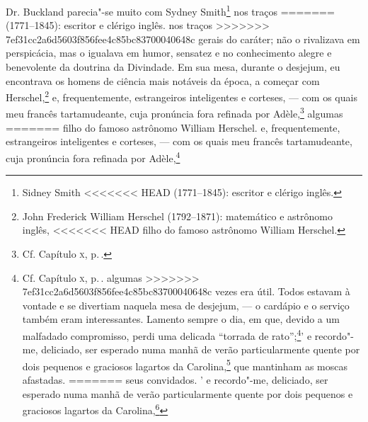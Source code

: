 {{{{{{{{{{{{{{{{{{{{{{{{{{{{{{{{{{{{{{{{{{{{{{{{{{{{{{{{{{{{{{{{{{{{{{{{{{{{{{{{{{{{{{{{{{{{{{{{{{{{{{{Dr. Buckland parecia"-se muito com Sydney Smith\footnote{Sidney Smith
<<<<<<< HEAD
  (1771--1845): escritor e clérigo inglês.} nos traços
=======
  (1771--1845): escritor e clérigo inglês.  nos traços
>>>>>>> 7ef31cc2a6d5603f856fee4c85bc83700040648c
gerais do caráter; não o rivalizava em perspicácia, mas o igualava em
humor, sensatez e no conhecimento alegre e benevolente da doutrina da
Divindade. Em sua mesa, durante o desjejum, eu encontrava os homens de
ciência mais notáveis da época, a começar com Herschel,\footnote{John
  Frederick William Herschel (1792--1871): matemático e astrônomo inglês,
<<<<<<< HEAD
  filho do famoso astrônomo William Herschel.} e,
frequentemente, estrangeiros inteligentes e corteses, --- com os quais
meu francês tartamudeante, cuja pronúncia fora refinada por
Adèle,\footnote{Cf. Capítulo \textsc{x}, p.\,\pageref{207}.} algumas
=======
  filho do famoso astrônomo William Herschel.  e,
frequentemente, estrangeiros inteligentes e corteses, --- com os quais
meu francês tartamudeante, cuja pronúncia fora refinada por
Adèle,\footnote{Cf. Capítulo \textsc{x}, p.\,\pageref{207}.  algumas
>>>>>>> 7ef31cc2a6d5603f856fee4c85bc83700040648c
vezes era útil. Todos estavam à vontade e se divertiam naquela mesa de
desjejum, --- o cardápio e o serviço também eram interessantes. Lamento
sempre o dia, em que, devido a um malfadado compromisso, perdi uma
delicada ``torrada de rato'';\footnote{Refere"-se, provavelmente, a uma
  refeição com o excêntrico William Buckland, que costumava servir
  estranhos animais --- ratos, crocodilos, panteras --- como alimentos a
<<<<<<< HEAD
  seus convidados.}' e recordo"-me, deliciado, ser
esperado numa manhã de verão particularmente quente por dois pequenos e
graciosos lagartos da Carolina,\footnote{Outra provável referência aos
  animais que o excêntrico naturalista William Buckland mantinha em
  cativeiro.} que mantinham as moscas afastadas.
=======
  seus convidados. ' e recordo"-me, deliciado, ser
esperado numa manhã de verão particularmente quente por dois pequenos e
graciosos lagartos da Carolina,\footnote{Outra provável referência aos
  animais que o excêntrico naturalista William Buckland mantinha em
  cativeiro.  que mantinham as moscas afastadas.
>>>>>>> 7ef31cc2a6d5603f856fee4c85bc83700040648c

}}}}}}}}}}}}}}}}}}}}}}}}}}}}}}}}}}}}}}}}}}}}}}}}}}}}}}}}}}}}}}}}}}}}}}}}}}}}}}}}}}}}}}}}}}}}}}}}}}}}}}}}}
